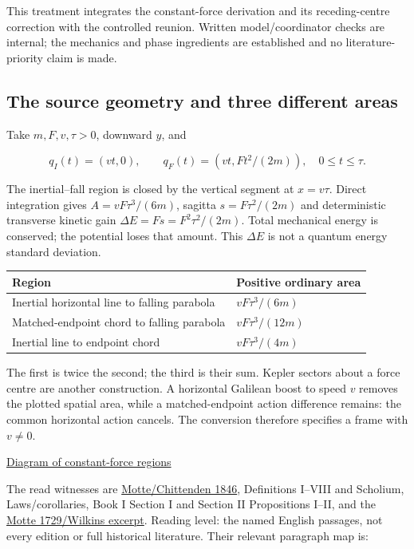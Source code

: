 \documentclass[11pt,a4paper]{article}
\begin{document}
This treatment integrates the constant-force derivation and its
receding-centre correction with the controlled reunion. Written
model/coordinator checks are internal; the mechanics and phase
ingredients are established and no literature-priority claim is made.

\subsection{The source geometry and three different
areas}\label{the-source-geometry-and-three-different-areas}

Take \(m,F,v,\tau>0\), downward \(y\), and

\[q_I(t)=(vt,0),\qquad q_F(t)=(vt,Ft^2/(2m)),\quad0\le t\le\tau.\]

The inertial--fall region is closed by the vertical segment at
\(x=v\tau\). Direct integration gives \(A=vF\tau^3/(6m)\), sagitta
\(s=F\tau^2/(2m)\) and deterministic transverse kinetic gain
\(\Delta E=Fs=F^2\tau^2/(2m)\). Total mechanical energy is conserved;
the potential loses that amount. This \(\Delta E\) is not a quantum
energy standard deviation.

\begin{longtable}[]{@{}ll@{}}
\toprule\noalign{}
Region & Positive ordinary area \\
\midrule\noalign{}
\endhead
\bottomrule\noalign{}
\endlastfoot
Inertial horizontal line to falling parabola & \(vF\tau^3/(6m)\) \\
Matched-endpoint chord to falling parabola & \(vF\tau^3/(12m)\) \\
Inertial line to endpoint chord & \(vF\tau^3/(4m)\) \\
\end{longtable}

The first is twice the second; the third is their sum. Kepler sectors
about a force centre are another construction. A horizontal Galilean
boost to speed \(v\) removes the plotted spatial area, while a
matched-endpoint action difference remains: the common horizontal action
cancels. The conversion therefore specifies a frame with \(v\ne0\).

\href{../out/constant-force-areas.svg}{Diagram of constant-force
regions}

The read witnesses are
\href{../docs/Newton_Principia_Motte1846.md}{Motte/Chittenden 1846},
Definitions I--VIII and Scholium, Laws/corollaries, Book I Section I and
Section II Propositions I--II, and the
\href{../docs/Newton_Principia_BookI_SectionI_Motte1729_Wilkins2002.md}{Motte
1729/Wilkins excerpt}. Reading level: the named English passages, not
every edition or full historical literature. Their relevant paragraph
map is:
\end{document}
